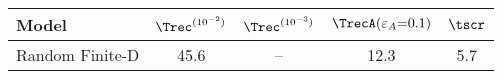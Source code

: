 \begin{tabular}{lcccc}
\toprule
Model & $\Trec^{(10^{-2})}$ & $\Trec^{(10^{-3})}$ & $\TrecA(\varepsilon_A{=}0.1)$ & $\tscr$ \\
\midrule
Random Finite-D & 45.6 & -- & 12.3 & 5.7 \\
\bottomrule
\end{tabular}